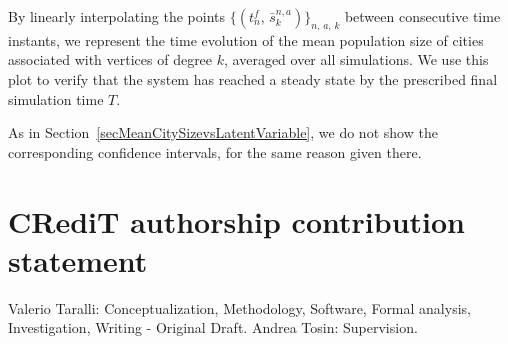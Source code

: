 \documentclass[a4paper]{article}
\begin{document}
By linearly interpolating the points $\{(t^f_n,\,\bar s^{n,a}_k)\}_{n,\,a,\,k}$ between consecutive time instants, we represent the time evolution of the mean population size of cities associated with vertices of degree $k$, averaged over all simulations. We use this plot to verify that the system has reached a steady state by the prescribed final simulation time $T$.
               
As in Section~\ref{secMeanCitySizevsLatentVariable}, we do not show the corresponding confidence intervals, for the same reason given there.

\section*{CRediT authorship contribution statement}
Valerio Taralli: Conceptualization, Methodology, Software, Formal analysis, Investigation, Writing - Original Draft. Andrea Tosin: Supervision.



\end{document}
